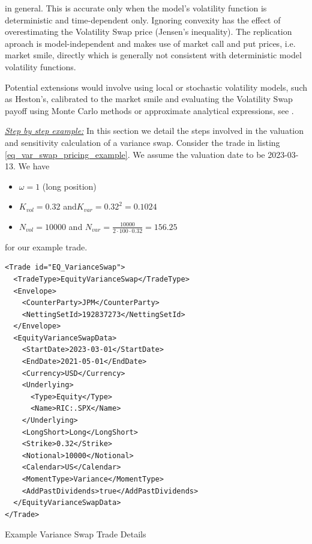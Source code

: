 in general. This is accurate only when the model's volatility function is deterministic and time-dependent only.
Ignoring convexity has the effect of overestimating the Volatility Swap price (Jensen's inequality). The replication
aproach is model-independent and makes use of market call and put prices, i.e. market smile, directly which is generally
not consistent with deterministic model volatility functions.

Potential extensions would involve using local or stochastic volatility models, such as Heston's, calibrated to the
market smile and evaluating the Volatility Swap payoff using Monte Carlo methods or approximate analytical expressions,
see \cite{Brockhaus_2000}.

\bigskip

\underline{\emph{Step by step example:}} In this section we detail the steps involved in the valuation and sensitivity
calculation of a variance swap. Consider the trade in listing \ref{eq_var_swap_pricing_example}. We assume the valuation
date to be 2023-03-13. We have

\begin{itemize}
\item $\omega = 1$ (long position)
\item $K_{vol} = 0.32$ and$K_{var} = 0.32^2 = 0.1024$
\item $N_{vol} = 10000$ and $N_{var} = \frac{10000}{2 \cdot 100 \cdot 0.32} = 156.25$
\end{itemize}

for our example trade.

\begin{listing}[ht]
\begin{verbatim}
<Trade id="EQ_VarianceSwap">
  <TradeType>EquityVarianceSwap</TradeType>
  <Envelope>
    <CounterParty>JPM</CounterParty>
    <NettingSetId>192837273</NettingSetId>
  </Envelope>
  <EquityVarianceSwapData>
    <StartDate>2023-03-01</StartDate>
    <EndDate>2021-05-01</EndDate>
    <Currency>USD</Currency>
    <Underlying>
      <Type>Equity</Type>
      <Name>RIC:.SPX</Name>
    </Underlying>
    <LongShort>Long</LongShort>
    <Strike>0.32</Strike>
    <Notional>10000</Notional>
    <Calendar>US</Calendar>
    <MomentType>Variance</MomentType>
    <AddPastDividends>true</AddPastDividends>
  </EquityVarianceSwapData>
</Trade>
\end{verbatim}
\caption{Example Variance Swap Trade Details}
\label{eq_var_swap_pricing_example}
\end{listing}


